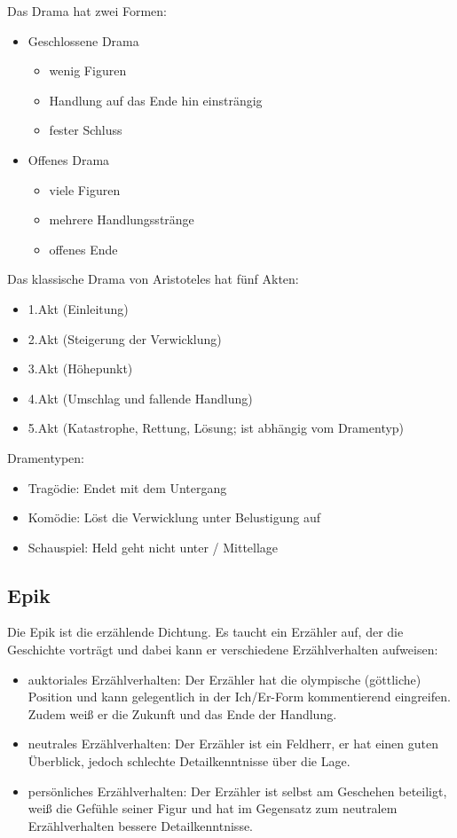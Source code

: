 \documentclass[12pt,a4paper]{article}
\begin{document}
Das Drama hat zwei Formen:

	\begin{itemize}
	\item Geschlossene Drama
		\begin{itemize}
		\item wenig Figuren
		\item Handlung auf das Ende hin einsträngig
		\item fester Schluss
		\end{itemize}
	\item Offenes Drama
		\begin{itemize}
		\item viele Figuren
		\item mehrere Handlungsstränge
		\item offenes Ende
		\end{itemize}
	\end{itemize}
	
Das klassische Drama von Aristoteles hat fünf Akten:

	\begin{itemize}
	\item 1.Akt (Einleitung)
	\item 2.Akt (Steigerung der Verwicklung)
	\item 3.Akt (Höhepunkt)
	\item 4.Akt (Umschlag und fallende Handlung)
	\item 5.Akt (Katastrophe, Rettung, Lösung; ist abhängig vom Dramentyp)
	\end{itemize}
	
Dramentypen:

	\begin{itemize}
	\item Tragödie: Endet mit dem Untergang
	\item Komödie: Löst die Verwicklung unter Belustigung auf
	\item Schauspiel: Held geht nicht unter / Mittellage
	\end{itemize}

\subsection{Epik}

Die Epik ist die erzählende Dichtung. Es taucht ein Erzähler auf, der die Geschichte vorträgt und dabei kann er verschiedene Erzählverhalten aufweisen:

	\begin{itemize}
	\item auktoriales Erzählverhalten: Der Erzähler hat die olympische (göttliche) Position und kann gelegentlich in der Ich/Er-Form kommentierend eingreifen. Zudem weiß er die Zukunft und das Ende der Handlung.
	\item neutrales Erzählverhalten: Der Erzähler ist ein Feldherr, er hat einen guten Überblick, jedoch schlechte Detailkenntnisse über die Lage.
	\item persönliches Erzählverhalten: Der Erzähler ist selbst am Geschehen  beteiligt, weiß die Gefühle seiner Figur und hat im Gegensatz zum neutralem Erzählverhalten bessere Detailkenntnisse.
	\end{itemize}
	
\end{document}
